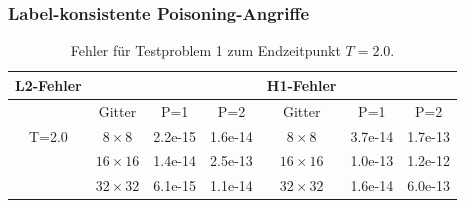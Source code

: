 \documentclass[twoside, 11pt,a4paper]{article}
\numberwithin{equation}{section}
\begin{document}
	\subsubsection{Label-konsistente Poisoning-Angriffe}
	\begin{table}[h]
		\begin{center}
			\begin{tabular}{| c c c c | c c c |}
				\hline
				\textbf{L2-Fehler} & & & & \textbf{H1-Fehler} & & \\
				\hline 
				& Gitter & P=1 & P=2 & Gitter & P=1 & P=2  \\
				
				\hline
				
				T=2.0 	&$8 \times 8 $ & 2.2e-15 & 1.6e-14 & $8 \times 8 $ & 3.7e-14 & 1.7e-13 \\
				&$16\times 16$ & 1.4e-14 & 2.5e-13 & $16\times 16$ & 1.0e-13 & 1.2e-12 \\
				&$32\times 32$ & 6.1e-15 & 1.1e-14 & $32\times 32$ & 1.6e-14 & 6.0e-13 \\
				\hline
			\end{tabular}
			\caption{Fehler für Testproblem 1 zum Endzeitpunkt $T=2.0$.}
			\label{errors_testproblem1}
		\end{center}
	\end{table}
\end{document}
